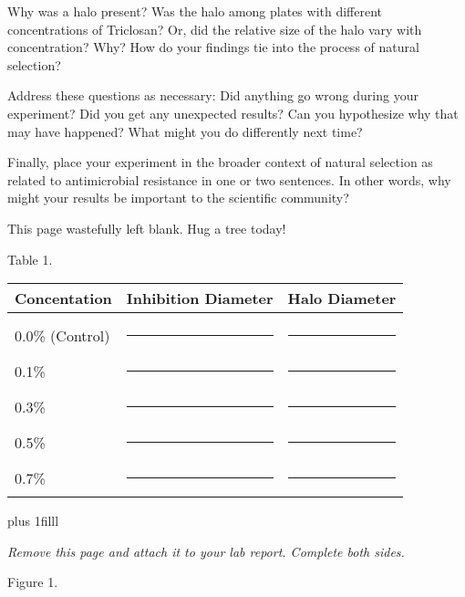 \documentclass[12pt]{exam}
\begin{document}
Why was a halo present? Was the halo among plates with different
concentrations of Triclosan? Or, did the relative size of the halo vary
with concentration? Why? How do your findings tie into the
process of natural selection?

Address these questions as necessary: Did anything go wrong during your
experiment? Did you get any unexpected results? Can you hypothesize
why that may have happened? What might you do differently next time?

Finally, place your experiment in the broader context of natural
selection as related to antimicrobial resistance in one or two
sentences. In other words, why might your results be important to the
scientific community?

\newpage

\thispagestyle{empty}

\vfill

	\hfil This page wastefully left blank. Hug a tree today!\hfill
	
\vfill


\newpage
\thispagestyle{empty}

Table 1.

\vspace{5\baselineskip}

\begin{longtable}[c]{lcc}
	\toprule
		Concentation	&	Inhibition Diameter	&	Halo Diameter \tabularnewline
	\midrule
		& & \tabularnewline[0.75em]
		0.0\% (Control)	& \rule{0.75in}{0.4pt} & \rule{0.75in}{0.4pt} \tabularnewline[2em]
		0.1\%	& \rule{0.75in}{0.4pt} & \rule{0.75in}{0.4pt} \tabularnewline[2em]
		0.3\%	& \rule{0.75in}{0.4pt} & \rule{0.75in}{0.4pt} \tabularnewline[2em]
		0.5\%	& \rule{0.75in}{0.4pt} & \rule{0.75in}{0.4pt} \tabularnewline[2em]
		0.7\%	& \rule{0.75in}{0.4pt} & \rule{0.75in}{0.4pt} \tabularnewline
	\bottomrule
\end{longtable}


\vskip0pt plus 1filll

\emph{Remove this page and attach it to your lab report.  Complete both sides.}

\newpage
\thispagestyle{empty}

Figure 1.\vspace{5\baselineskip}

\begin{center}


\end{center}
\end{document}
